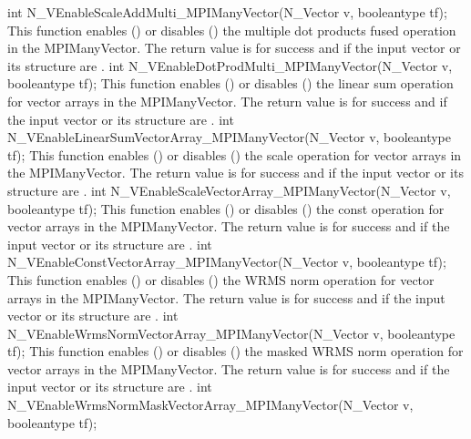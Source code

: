 {
  int N\_VEnableScaleAddMulti\_MPIManyVector(N\_Vector v, booleantype tf);
}
{
  This function enables () or disables () the multiple
  dot products fused operation in the MPIManyVector. The return value is 
  for success and  if the input vector or its  structure are
  .
}
{
  int N\_VEnableDotProdMulti\_MPIManyVector(N\_Vector v, booleantype tf);
}
{
  This function enables () or disables () the linear sum
  operation for vector arrays in the MPIManyVector. The return value is  for
  success and  if the input vector or its  structure are .
}
{
  int N\_VEnableLinearSumVectorArray\_MPIManyVector(N\_Vector v, booleantype tf);
}
{
  This function enables () or disables () the scale
  operation for vector arrays in the MPIManyVector. The return value is  for
  success and  if the input vector or its  structure are .
}
{
  int N\_VEnableScaleVectorArray\_MPIManyVector(N\_Vector v, booleantype tf);
}
{
  This function enables () or disables () the const
  operation for vector arrays in the MPIManyVector. The return value is  for
  success and  if the input vector or its  structure are .
}
{
  int N\_VEnableConstVectorArray\_MPIManyVector(N\_Vector v, booleantype tf);
}
{
  This function enables () or disables () the WRMS norm
  operation for vector arrays in the MPIManyVector. The return value is  for
  success and  if the input vector or its  structure are .
}
{
  int N\_VEnableWrmsNormVectorArray\_MPIManyVector(N\_Vector v, booleantype tf);
}
{
  This function enables () or disables () the masked WRMS
  norm operation for vector arrays in the MPIManyVector. The return value is
   for success and  if the input vector or its  structure are
  .
}
{
  int N\_VEnableWrmsNormMaskVectorArray\_MPIManyVector(N\_Vector v, booleantype tf);
}
